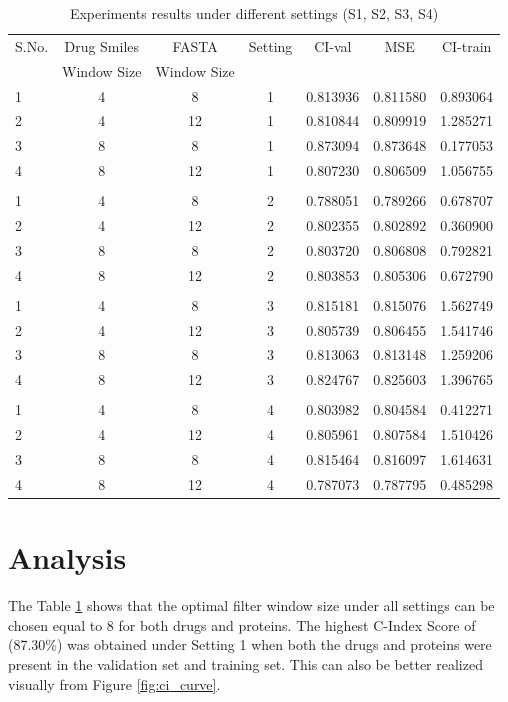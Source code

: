 \begin{table}[ht]
    \centering
    \caption{Experiments results under different settings (S1, S2, S3, S4)}
    \begin{tabular}{|l|c|c|c|c|c|c|}
    \hline 
    
     S.No. & Drug Smiles & FASTA & Setting & CI-val & MSE & CI-train \\ 
     & Window Size &  Window Size  &  & &  &  \\  \hline 
    1 & 4 & 8 & 1 & 0.813936 & 0.811580 & 0.893064 \\ \hline
    2 & 4 & 12 & 1 & 0.810844 & 0.809919 & 1.285271 \\ \hline
    3 & 8 & 8 & 1 & 0.873094 & 0.873648 & 0.177053 \\ \hline
    4 & 8 & 12 & 1 & 0.807230 & 0.806509 & 1.056755 \\ \hline
    \\ \hline
    1 & 4 & 8 & 2 & 0.788051 & 0.789266 & 0.678707 \\ \hline
    2 & 4 & 12 & 2 & 0.802355 & 0.802892 & 0.360900 \\ \hline
    3 & 8 & 8 & 2 & 0.803720 & 0.806808 & 0.792821 \\ \hline
    4 & 8 & 12 & 2 & 0.803853 & 0.805306 & 0.672790 \\ \hline
    \\ \hline
    1 & 4 & 8 & 3 & 0.815181 & 0.815076 & 1.562749 \\ \hline
    2 & 4 & 12 & 3 & 0.805739 & 0.806455 & 1.541746 \\ \hline
    3 & 8 & 8 & 3 & 0.813063 & 0.813148 & 1.259206 \\ \hline
    4 & 8 & 12 & 3 & 0.824767 & 0.825603 & 1.396765 \\ \hline
    \\ \hline
    1 & 4 & 8 & 4 & 0.803982 & 0.804584 & 0.412271 \\ \hline
    2 & 4 & 12 & 4 & 0.805961 & 0.807584 & 1.510426 \\ \hline
    3 & 8 & 8 & 4 & 0.815464 & 0.816097 & 1.614631 \\ \hline
    4 & 8 & 12 & 4 & 0.787073 & 0.787795 & 0.485298 \\ \hline
    
    
    \end{tabular}
    \label{table:results}
\end{table}

\section{Analysis}
The Table \ref{table:results} shows that the optimal filter window size under all settings can be chosen equal to 8 for both drugs and proteins. The highest C-Index Score of (87.30\%) was obtained under Setting 1 when both the drugs and proteins were present in the validation set and training set. This can also be better realized visually from Figure \ref{fig:ci_curve}.
 
